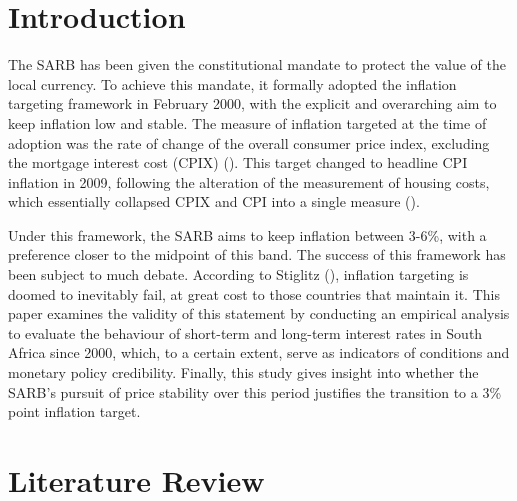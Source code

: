 \documentclass[11pt,preprint]{elsarticle}
\numberwithin{equation}{section}
\numberwithin{figure}{section}
\numberwithin{table}{section}
\begin{document}

\headsep 35pt %




\section{\texorpdfstring{Introduction
\label{Introduction}}{Introduction }}\label{introduction}

The SARB has been given the constitutional mandate to protect the value
of the local currency. To achieve this mandate, it formally adopted the
inflation targeting framework in February 2000, with the explicit and
overarching aim to keep inflation low and stable. The measure of
inflation targeted at the time of adoption was the rate of change of the
overall consumer price index, excluding the mortgage interest cost
(CPIX) (). This target
changed to headline CPI inflation in 2009, following the alteration of
the measurement of housing costs, which essentially collapsed CPIX and
CPI into a single measure ().

Under this framework, the SARB aims to keep inflation between 3-6\%,
with a preference closer to the midpoint of this band. The success of
this framework has been subject to much debate. According to Stiglitz
(), inflation targeting is doomed to
inevitably fail, at great cost to those countries that maintain it. This
paper examines the validity of this statement by conducting an empirical
analysis to evaluate the behaviour of short-term and long-term interest
rates in South Africa since 2000, which, to a certain extent, serve as
indicators of conditions and monetary policy credibility. Finally, this
study gives insight into whether the SARB's pursuit of price stability
over this period justifies the transition to a 3\% point inflation
target.

\section{\texorpdfstring{Literature Review
\label{Literature Review}}{Literature Review }}\label{literature-review}
\end{document}
